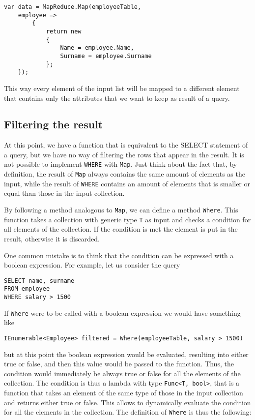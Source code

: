 \begin{lstlisting}
var data = MapReduce.Map(employeeTable,
	employee =>
		{
			return new
			{
				Name = employee.Name,
				Surname = employee.Surname
			};
	});
\end{lstlisting}

This way every element of the input list will be mapped to a different element that contains only the attributes that we want to keep as result of a query.

\subsection{Filtering the result}
\label{subsec:filter}
At this point, we have a function that is equivalent to the SELECT statement of a query, but we have no way of filtering the rows that appear in the result. It is not possible to implement \texttt{WHERE} with \texttt{Map}. Just think about the fact that, by definition, the result of \texttt{Map} always contains the same amount of elements as the input, while the result of \texttt{WHERE} contains an amount of elements that is smaller or equal than those in the input collection.

By following a method analogous to \texttt{Map}, we can define a method \texttt{Where}. This function takes a collection with generic type \texttt{T} as input and checks a condition for all elements of the collection. If the condition is met the element is put in the result, otherwise it is discarded.

One common mistake is to think that the condition can be expressed with a boolean expression. For example, let us consider the query

\begin{lstlisting}[caption = Query with filtering, label = code:where_query]
SELECT name, surname
FROM employee
WHERE salary > 1500
\end{lstlisting}

\noindent
If \texttt{Where} were to be called with a boolean expression we would have something like

\begin{lstlisting}
IEnumerable<Employee> filtered = Where(employeeTable, salary > 1500)
\end{lstlisting}

\noindent
but at this point the boolean expression would be evaluated, resulting into either true or false, and then this value would be passed to the function. Thus, the condition would immediately be always true or false for all the elements of the collection. The condition is thus a lambda with type \texttt{Func<T, bool>}, that is a function that takes an element of the same type of those in the input collection and returns either true or false. This allows to dynamically evaluate the condition for all the elements in the collection. The definition of \texttt{Where} is thus the following:

